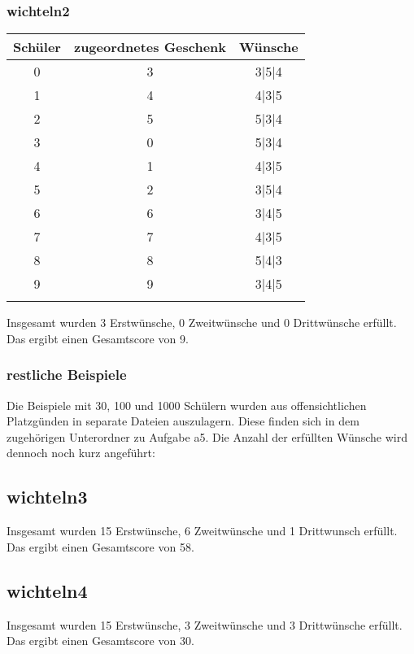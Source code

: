 \documentclass[a4paper, 12pt]{scrartcl}
\begin{document}
\subsubsection{wichteln2}
\begin{table}[H]
    \centering
\begin{tabular}{@{}ccc@{}}
\toprule
Schüler & zugeordnetes Geschenk & Wünsche               \\ \midrule
0        &     3                &  3|5|4    \\
1        &     4                &  4|3|5    \\
2        &     5                &  5|3|4    \\
3        &     0                &  5|3|4    \\
4        &     1                &  4|3|5    \\
5        &     2                &  3|5|4    \\
6        &     6                &  3|4|5    \\
7        &     7                &  4|3|5    \\
8        &     8                &  5|4|3    \\
9        &     9                &  3|4|5    \\
        &            \\ \bottomrule

\end{tabular}
\end{table}

Insgesamt wurden 3 Erstwünsche, 0 Zweitwünsche und 0 Drittwünsche erfüllt. Das ergibt einen Gesamtscore von 9.

\subsubsection{restliche Beispiele}
Die Beispiele mit 30, 100 und 1000 Schülern wurden aus offensichtlichen Platzgünden in separate Dateien auszulagern. Diese finden sich in dem zugehörigen Unterordner zu Aufgabe a5. Die Anzahl der erfüllten Wünsche wird dennoch noch kurz angeführt:

\subsection{wichteln3}
Insgesamt wurden 15 Erstwünsche, 6 Zweitwünsche und 1 Drittwunsch erfüllt. Das ergibt einen Gesamtscore von 58.

\subsection{wichteln4}
Insgesamt wurden 15 Erstwünsche, 3 Zweitwünsche und 3 Drittwünsche erfüllt. Das ergibt einen Gesamtscore von 30.
\end{document}
